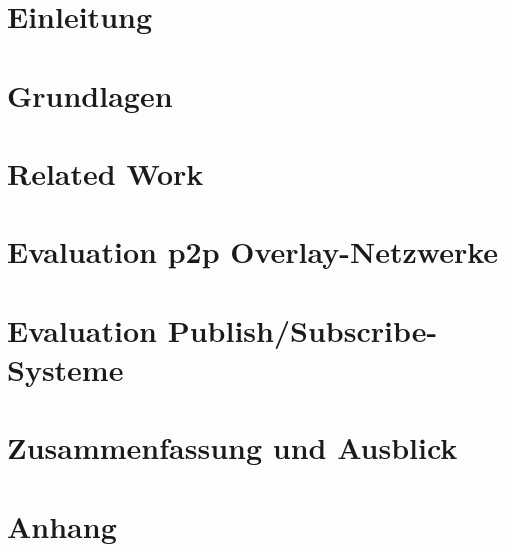 
\chapter{Einleitung}
\label{chap:einleitung}


\chapter{Grundlagen}
\label{chap:grundlagen}


\chapter{Related Work}
\label{chap:related}


\chapter{Evaluation p2p Overlay-Netzwerke}
\label{chap:evaluation_p2p}


\chapter{Evaluation Publish/Subscribe-Systeme}
\label{chap:evaluation_pubsub}



\chapter{Zusammenfassung und Ausblick} 
\label{chap:zus}


\appendix

\chapter{Anhang}

